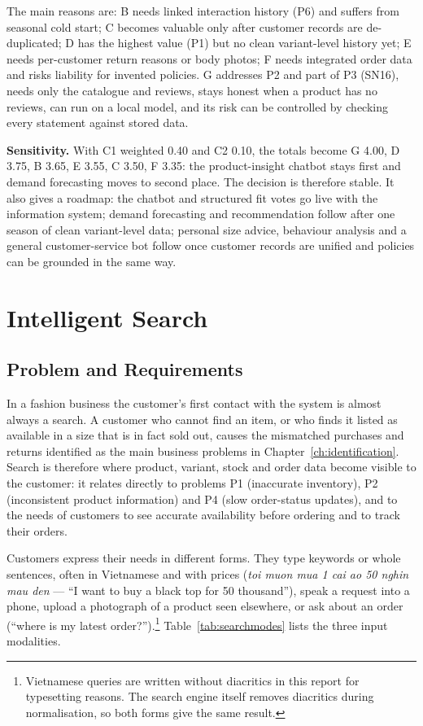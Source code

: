 The main reasons are: B needs linked interaction history (P6) and suffers from seasonal cold start; C becomes valuable only after customer records are de-duplicated; D has the highest value (P1) but no clean variant-level history yet; E needs per-customer return reasons or body photos; F needs integrated order data and risks liability for invented policies. G addresses P2 and part of P3 (SN16), needs only the catalogue and reviews, stays honest when a product has no reviews, can run on a local model, and its risk can be controlled by checking every statement against stored data.

\textbf{Sensitivity.} With C1 weighted 0.40 and C2 0.10, the totals become G 4.00, D 3.75, B 3.65, E 3.55, C 3.50, F 3.35: the product-insight chatbot stays first and demand forecasting moves to second place. The decision is therefore stable. It also gives a roadmap: the chatbot and structured fit votes go live with the information system; demand forecasting and recommendation follow after one season of clean variant-level data; personal size advice, behaviour analysis and a general customer-service bot follow once customer records are unified and policies can be grounded in the same way.

\section{Intelligent Search}
\label{sec:search}

\subsection{Problem and Requirements}
\label{subsec:searchproblem}
In a fashion business the customer's first contact with the system is almost always a search. A customer who cannot find an item, or who finds it listed as available in a size that is in fact sold out, causes the mismatched purchases and returns identified as the main business problems in Chapter~\ref{ch:identification}. Search is therefore where product, variant, stock and order data become visible to the customer: it relates directly to problems P1 (inaccurate inventory), P2 (inconsistent product information) and P4 (slow order-status updates), and to the needs of customers to see accurate availability before ordering and to track their orders.

Customers express their needs in different forms. They type keywords or whole sentences, often in Vietnamese and with prices (\emph{toi muon mua 1 cai ao 50 nghin mau den} --- ``I want to buy a black top for 50 thousand''), speak a request into a phone, upload a photograph of a product seen elsewhere, or ask about an order (``where is my latest order?'').\footnote{Vietnamese queries are written without diacritics in this report for typesetting reasons. The search engine itself removes diacritics during normalisation, so both forms give the same result.} Table~\ref{tab:searchmodes} lists the three input modalities.


